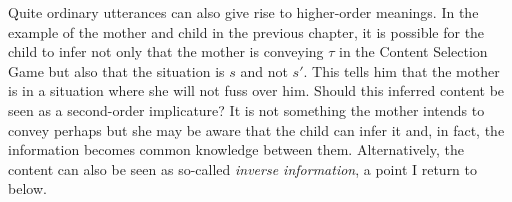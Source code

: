 Quite ordinary utterances can also give rise to higher-order meanings. In the example of the mother and child in the previous chapter, it is possible for the child to infer not only that the mother is conveying $\tau$ in the Content Selection Game but also that the situation is $s$ and not $s'$. This tells him that the mother is in a situation where she will not fuss over him. Should this inferred content be seen as a second-order implicature? It is not something the mother intends to convey perhaps but she may be aware that the child can infer it and, in fact, the information becomes common knowledge between them. Alternatively, the content can also be seen as so-called \emph{inverse information}, a point I return to below.

%
%
%
%
%
%
%
